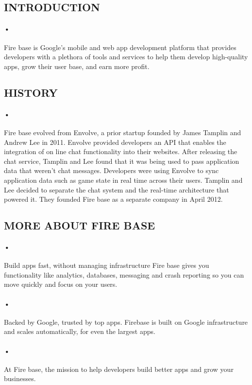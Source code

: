 \documentclass[7pt]{article}
\begin{document}
\subsection{INTRODUCTION}
\paragraph{•}
Fire base is Google's mobile and web app development platform that provides developers with a plethora of tools and services to help them develop high-quality apps, grow their user base, and earn more profit.
\subsection{HISTORY}
\paragraph{•}
Fire base evolved from Envolve, a prior startup founded by James Tamplin and Andrew Lee in 2011. Envolve provided developers an API that enables the integration of on line chat functionality into their websites. After releasing the chat service, Tamplin and Lee found that it was being used to pass application data that weren't chat messages. Developers were using Envolve to sync application data such as game state in real time across their users.
Tamplin and Lee decided to separate the chat system and the real-time architecture that powered it. They founded Fire base as a separate company
in April 2012.

\subsection{MORE ABOUT FIRE BASE}
\paragraph{•} 
Build apps fast, without managing infrastructure Fire base gives you functionality like analytics, databases, messaging and crash reporting so you can move quickly and focus on your users.
\paragraph{•}
Backed by Google, trusted by top apps. Firebase is built on Google
infrastructure and scales automatically, for even the largest apps.
\paragraph{•}
At Fire base, the mission to help developers build better apps and grow your businesses.\cite{john}
\end{document}
